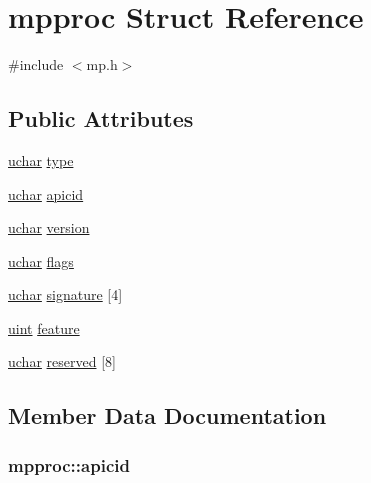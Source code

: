 \hypertarget{structmpproc}{}\section{mpproc Struct Reference}
\label{structmpproc}


{\ttfamily \#include $<$mp.\+h$>$}

\subsection*{Public Attributes}
\begin{DoxyCompactItemize}
\item 
\hyperlink{types_8h_a65f85814a8290f9797005d3b28e7e5fc}{uchar} \hyperlink{structmpproc_acd7371100bf5624c8eafe1280826f358}{type}
\item 
\hyperlink{types_8h_a65f85814a8290f9797005d3b28e7e5fc}{uchar} \hyperlink{structmpproc_a935db2a1561da721c867f4b82c51d04d}{apicid}
\item 
\hyperlink{types_8h_a65f85814a8290f9797005d3b28e7e5fc}{uchar} \hyperlink{structmpproc_a6d7948bc046404527c0eec71e3e93209}{version}
\item 
\hyperlink{types_8h_a65f85814a8290f9797005d3b28e7e5fc}{uchar} \hyperlink{structmpproc_abac8cdeb6e601ce8e5bf343c8efb3680}{flags}
\item 
\hyperlink{types_8h_a65f85814a8290f9797005d3b28e7e5fc}{uchar} \hyperlink{structmpproc_a2e18fc2c01b252da2c0d671fdce95eb5}{signature} \mbox{[}4\mbox{]}
\item 
\hyperlink{types_8h_a91ad9478d81a7aaf2593e8d9c3d06a14}{uint} \hyperlink{structmpproc_a62dc15542eee0797a4636b701439b6d9}{feature}
\item 
\hyperlink{types_8h_a65f85814a8290f9797005d3b28e7e5fc}{uchar} \hyperlink{structmpproc_a94bbb1f4794bcf6126fb36520f668134}{reserved} \mbox{[}8\mbox{]}
\end{DoxyCompactItemize}


\subsection{Member Data Documentation}
\subsubsection[{\texorpdfstring{apicid}{apicid}}]{ mpproc\+::apicid}\hypertarget{structmpproc_a935db2a1561da721c867f4b82c51d04d}{}\label{structmpproc_a935db2a1561da721c867f4b82c51d04d}
